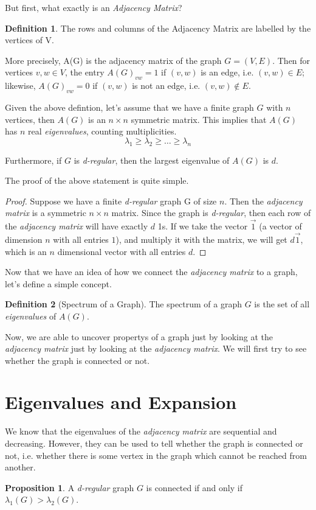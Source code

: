 \documentclass{article}
\theoremstyle{theorem}
\theoremstyle{definition}
\newtheorem{definition}{Definition}[section]
\theoremstyle{example}
\theoremstyle{proposition}
\newtheorem{proposition}{Proposition}[section]
\begin{document}
        But first, what exactly is an \textit{Adjacency Matrix}?
        \begin{definition}
            The rows and columns of the Adjacency Matrix are labelled by the vertices of V.

            More precisely, A(G) is the adjacency matrix of the graph $G = (V,E)$.
            Then for vertices $v,w \in V$, the entry $A(G)_{vw} = 1$ if $(v,w)$ is an edge, i.e. $(v,w) \in E$; likewise, $A(G)_{vw} = 0$ if $(v,w)$ is not an edge, i.e. $(v,w) \not \in E$.
        \end{definition}

        Given the above defintion, let's assume that we have a finite graph $G$ with $n$ vertices, then $A(G)$ is an $n \times n$ symmetric matrix. This implies that $A(G)$ has $n$ real \textit{eigenvalues}, counting multiplicities.
        \[\lambda_1 \geq \lambda_2 \geq \ldots \geq \lambda_n\]

        Furthermore, if $G$ is \textit{d-regular}, then the largest eigenvalue of $A(G)$ is $d$.

        The proof of the above statement is quite simple.
        \newpage
        \begin{proof}
            Suppose we have a finite \textit{d-regular} graph G of size $n$. Then the \textit{adjacency matrix} is a symmetric $n \times n$ matrix.
            Since the graph is \textit{d-regular}, then each row of the \textit{adjacency matrix} will have exactly $d$ 1s.
            If we take the vector $\vec{1}$ (a vector of dimension $n$ with all entries $1$), and multiply it with the matrix, we will get $d \vec{1}$, which is an $n$ dimensional vector with all entries $d$.
        \end{proof}

        Now that we have an idea of how we connect the \textit{adjacency matrix} to a graph, let's define a simple concept.
        \begin{definition}[Spectrum of a Graph]
            The spectrum of a graph $G$ is the set of all \textit{eigenvalues} of $A(G)$.
        \end{definition}

        Now, we are able to uncover propertys of a graph just by looking at the \textit{adjacency matrix} just by looking at the \textit{adjacency matrix}. We will first try to see whether the graph is connected or not.

        \section{Eigenvalues and Expansion}
        We know that the eigenvalues of the \textit{adjacency matrix} are sequential and decreasing. However, they can be used to tell whether the graph is connected or not, i.e. whether there is some vertex in the graph which cannot be reached from another.
        \begin{proposition}
            A \textit{d-regular} graph $G$ is connected if and only if $\lambda_1(G) > \lambda_2(G)$.
        \end{proposition}
\end{document}
